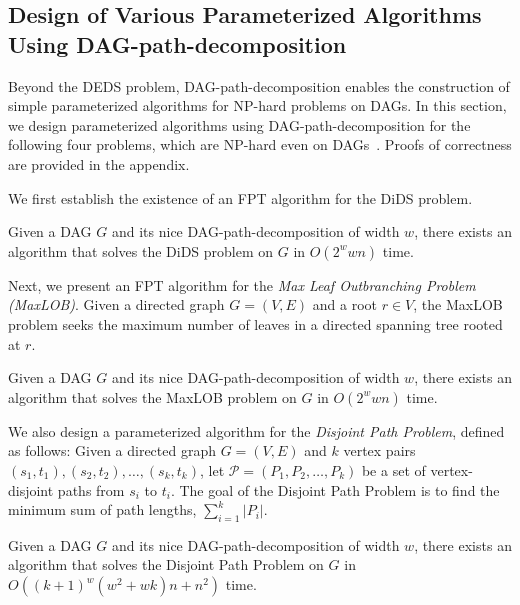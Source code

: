 \documentclass[runningheads]{llncs}
\theoremstyle{plain}
\theoremstyle{definition}
\begin{document}
\subsection{Design of Various Parameterized Algorithms Using DAG-path-decomposition}

Beyond the DEDS problem, DAG-path-decomposition enables the construction of simple parameterized algorithms for NP-hard problems on DAGs.  
In this section, we design parameterized algorithms using DAG-path-decomposition for the following four problems, which are NP-hard even on DAGs~\cite{art17}.  
Proofs of correctness are provided in the appendix.  

We first establish the existence of an FPT algorithm for the DiDS problem.  

\begin{theorem}\label{theorem_dids}
    Given a DAG \(G\) and its nice DAG-path-decomposition of width \(w\), there exists an algorithm that solves the DiDS problem on \(G\) in \(O(2^w w n)\) time.  
\end{theorem}

Next, we present an FPT algorithm for the \emph{Max Leaf Outbranching Problem (MaxLOB)}.  
Given a directed graph \(G = (V, E)\) and a root \(r \in V\), the MaxLOB problem seeks the maximum number of leaves in a directed spanning tree rooted at \(r\). 

\begin{theorem}\label{theorem_lob}
    Given a DAG \(G\) and its nice DAG-path-decomposition of width \(w\), there exists an algorithm that solves the MaxLOB problem on \(G\) in \(O(2^w w n)\) time.  
\end{theorem}

We also design a parameterized algorithm for the \emph{Disjoint Path Problem}, defined as follows:  
Given a directed graph \(G = (V, E)\) and \(k\) vertex pairs \((s_1, t_1), (s_2, t_2), \dots, (s_k, t_k)\), let \(\mathcal{P} = (P_1, P_2, \dots, P_k)\) be a set of vertex-disjoint paths from \(s_i\) to \(t_i\).  
The goal of the Disjoint Path Problem is to find the minimum sum of path lengths, \(\sum_{i=1}^{k} |P_i|\).  

\begin{theorem}\label{theorem_disjoint_path}
    Given a DAG \(G\) and its nice DAG-path-decomposition of width \(w\), there exists an algorithm that solves the Disjoint Path Problem on \(G\) in \(O((k+1)^w (w^2 + wk) n + n^2)\) time.  
\end{theorem}
\end{document}
